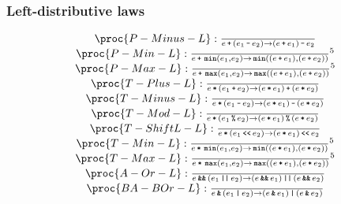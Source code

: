 \begin{frame}[plain]

\frametitle{Left-distributive laws}

\footnotesize
\[
\begin{matrix}
\proc{P-Minus-L}:{\over
e \lp \p{e_1 \lm e_2} \rightarrow \p{e \lp e_1 } \lm e_2
}\\
\proc{P-Min-L}:{\over
e \lp \LMIN\p{e_1, e_2} \rightarrow \LMIN\p{\p{e \lp e_1}, \p{e \lp e_2}}
}\footnotemark[5]\\
\proc{P-Max-L}:{\over
e \lp \LMAX\p{e_1, e_2} \rightarrow \LMAX\p{\p{e \lp e_1}, \p{e \lp e_2}}
}\footnotemark[5]\\
\proc{T-Plus-L}:{\over
e \lt \p{e_1 \lp e_2} \rightarrow \p{ e \lt e_1 } \lp \p{ e \lt e_2 }
}\\
\proc{T-Minus-L}:{\over
e \lt \p{e_1 \lm e_2} \rightarrow \p{ e\lt e_1 } \lm \p{ e \lt e_2 }
}\\
\proc{T-Mod-L}:{\over
e \lt \p{e_1 \lmod e_2}\rightarrow \p{ e \lt e_1 } \lmod \p{ e \lt e_2 }
}\\
\proc{T-ShiftL-L}:{\over
e \lt \p{e_1 \LBSL e_2} \rightarrow \p{ e \lt e_1 } \LBSL e_2
}\\
\proc{T-Min-L}:{\over
e \lt \LMIN\p{e_1, e_2} \rightarrow \LMIN\p{\p{e \lt e_1}, \p{e \lt e_2}}
}\footnotemark[5]\\
\proc{T-Max-L}:{\over
e \lt \LMAX\p{e_1, e_2} \rightarrow \LMAX\p{\p{e \lt e_1}, \p{e \lt e_2}}
}\footnotemark[5]\\
\proc{A-Or-L}:{\over
e \LAND \p{e_1 \LOR e_2}\rightarrow \p{ e \LAND e_1 } \LOR \p{ e \LAND e_2 }
}\\
\proc{BA-BOr-L}:{\over
e \LBAND \p{e_1 \LBOR e_2}\rightarrow \p{ e \LBAND e_1 } \LBOR \p{ e \LBAND e_2
}
}
\end{matrix}
\]


\end{frame}
